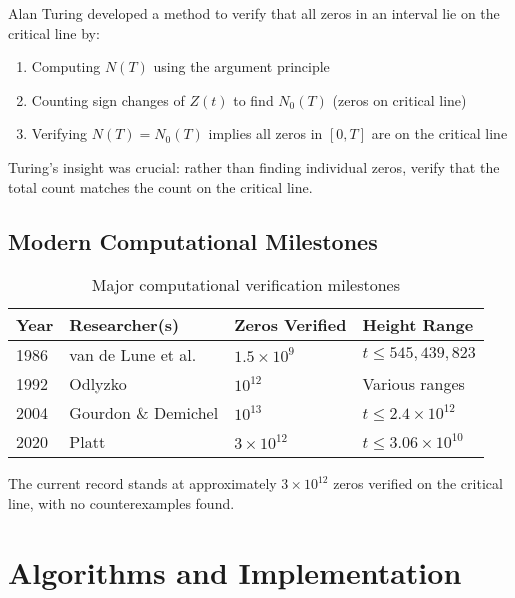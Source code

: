 \begin{theorem}
Alan Turing developed a method to verify that all zeros in an interval lie on the critical line by:
\begin{enumerate}
\item Computing $N(T)$ using the argument principle
\item Counting sign changes of $Z(t)$ to find $N_0(T)$ (zeros on critical line)
\item Verifying $N(T) = N_0(T)$ implies all zeros in $[0,T]$ are on the critical line
\end{enumerate}
\end{theorem}

Turing's insight was crucial: rather than finding individual zeros, verify that the total count matches the count on the critical line.

\subsection{Modern Computational Milestones}

\begin{table}[h]
\centering
\begin{tabular}{|l|l|l|l|}
\hline
\textbf{Year} & \textbf{Researcher(s)} & \textbf{Zeros Verified} & \textbf{Height Range} \\
\hline
1986 & van de Lune et al. & $1.5 \times 10^9$ & $t \leq 545,439,823$ \\
1992 & Odlyzko \cite{odlyzko1985} & $10^{12}$ & Various ranges \\
2004 & Gourdon \& Demichel & $10^{13}$ & $t \leq 2.4 \times 10^{12}$ \\
2020 & Platt \cite{plattrigaux2020} & $3 \times 10^{12}$ & $t \leq 3.06 \times 10^{10}$ \\
\hline
\end{tabular}
\caption{Major computational verification milestones}
\end{table}

\begin{remark}
The current record stands at approximately $3 \times 10^{12}$ zeros verified on the critical line, with no counterexamples found.
\end{remark}

\section{Algorithms and Implementation}
\label{sec:algorithms}

